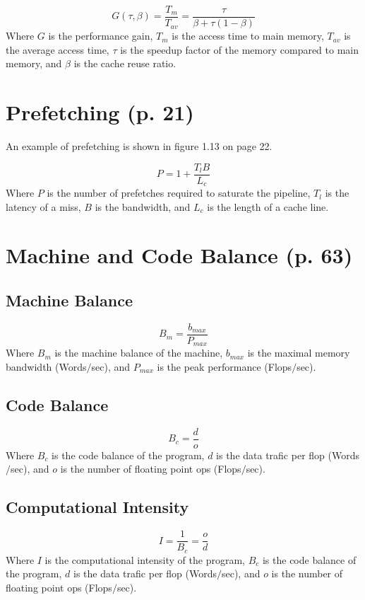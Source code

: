 \documentclass{article}
\begin{document}
		\begin{equation}
			G(\tau, \beta)=\frac{T_m}{T_{av}}=\frac{\tau}{\beta+\tau(1-\beta)}
		\end{equation}
		Where $G$ is the performance gain, $T_m$ is the access time to main memory, $T_{av}$ is the average access time, $\tau$ is the speedup factor of the memory compared to main memory, and $\beta$ is the cache reuse ratio.
	
	\section{Prefetching (p. 21)}
		An example of prefetching is shown in figure 1.13 on page 22.
	
		\begin{equation}
			P=1+\frac{T_l B}{L_c}
		\end{equation}
		Where $P$ is the number of prefetches required to saturate the pipeline, $T_l$ is the latency of a miss, $B$ is the bandwidth, and $L_c$ is the length of a cache line.
	
	\section{Machine and Code Balance (p. 63)}
		\subsection{Machine Balance}
			\begin{equation}
				B_m=\frac{b_{max}}{P_{max}}
			\end{equation}
			Where $B_m$ is the machine balance of the machine, $b_{max}$ is the maximal memory bandwidth (Words$/$sec), and $P_{max}$ is the peak performance (Flops$/$sec).

		\subsection{Code Balance}
			\begin{equation}
				B_c=\frac{d}{o}
			\end{equation}
			Where $B_c$ is the code balance of the program, $d$ is the data trafic per flop (Words$/$sec), and $o$ is the number of floating point ops (Flops$/$sec).
		
		\subsection{Computational Intensity}
			\begin{equation}
				I=\frac{1}{B_c}=\frac{o}{d}
			\end{equation}
			Where $I$ is the computational intensity of the program, $B_c$ is the code balance of the program, $d$ is the data trafic per flop (Words$/$sec), and $o$ is the number of floating point ops (Flops$/$sec).
		
\end{document}
